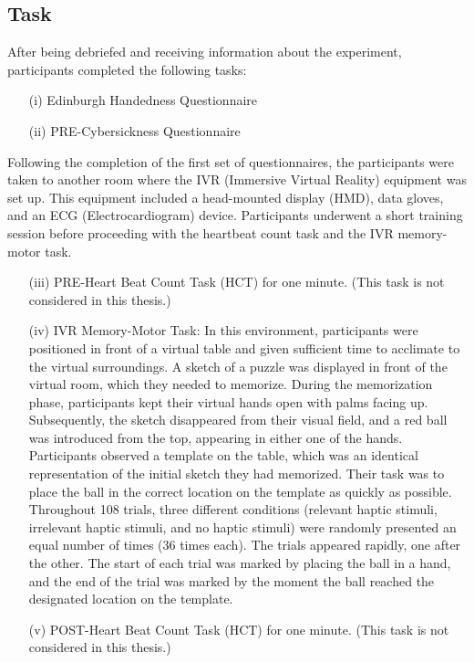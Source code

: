 \documentclass[12pt,oneside,openright]{report}
\begin{document}
    \subsection*{Task}
    After being debriefed and receiving information about the experiment, participants completed the following tasks:
\begin{enumerate}
\item[(i)] Edinburgh Handedness Questionnaire
\item[(ii)] PRE-Cybersickness Questionnaire
\end{enumerate}

Following the completion of the first set of questionnaires, the participants were taken to another room where the IVR (Immersive Virtual Reality) equipment was set up. This equipment included a head-mounted display (HMD), data gloves, and an ECG (Electrocardiogram) device. Participants underwent a short training session before proceeding with the heartbeat count task and the IVR memory-motor task.

\begin{enumerate}
\item[(iii)] PRE-Heart Beat Count Task (HCT) for one minute. (This task is not considered in this thesis.)
\item[(iv)] IVR Memory-Motor Task: In this environment, participants were positioned in front of a virtual table and given sufficient time to acclimate to the virtual surroundings. A sketch of a puzzle was displayed in front of the virtual room, which they needed to memorize. During the memorization phase, participants kept their virtual hands open with palms facing up. Subsequently, the sketch disappeared from their visual field, and a red ball was introduced from the top, appearing in either one of the hands. Participants observed a template on the table, which was an identical representation of the initial sketch they had memorized. Their task was to place the ball in the correct location on the template as quickly as possible. Throughout 108 trials, three different conditions (relevant haptic stimuli, irrelevant haptic stimuli, and no haptic stimuli) were randomly presented an equal number of times (36 times each). The trials appeared rapidly, one after the other. The start of each trial was marked by placing the ball in a hand, and the end of the trial was marked by the moment the ball reached the designated location on the template.
\item[(v)] POST-Heart Beat Count Task (HCT) for one minute. (This task is not considered in this thesis.)
\end{enumerate}
\end{document}

